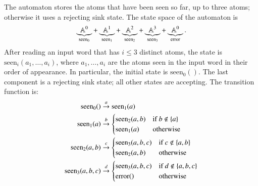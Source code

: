 {
    The automaton stores the atoms that have been seen so far, up to three atoms; otherwise it uses a rejecting sink state. The state space of the automaton is 
    \begin{align*}
    \underbrace{\mathbb A^0}_{\text{seen}_0} + \underbrace{\mathbb A^1}_{\text{seen}_1} + \underbrace{\mathbb A^2}_{\text{seen}_2} + \underbrace{\mathbb A^3}_{\text{seen}_3} + \underbrace{\mathbb A^0}_{\text{error}}.
    \end{align*}
    After reading an input word that has $i \leq 3$ distinct atoms, the state is $\text{seen}_i(a_1,\ldots,a_i)$, where $a_1,\ldots,a_i$ are the atoms seen in the input word in their order of appearance. In particular, the initial state is $\text{seen}_0()$. The last component is a rejecting sink state; all other states are accepting. The transition function is:
    \begin{align*}
    \text{seen}_0()  & \stackrel a \to \text{seen}_1(a) \\
    \text{seen}_1(a) & \stackrel b \to 
    \begin{cases}
    \text{seen}_2(a,b) & \text{if $b \not\in \{a\}$} \\
    \text{seen}_1(a) & \text{otherwise}
    \end{cases}\\
    \text{seen}_2(a,b) & \stackrel c \to
    \begin{cases}
    \text{seen}_3(a,b,c) & \text{if $c \not\in \{a,b\}$} \\
    \text{seen}_2(a,b) & \text{otherwise}
    \end{cases}\\
    \text{seen}_3(a,b,c) & \stackrel d \to 
    \begin{cases}
    \text{seen}_3(a,b,c) & \text{if $d \not\in \{a,b,c\}$} \\
    \text{error}() & \text{otherwise}
    \end{cases}
\end{align*}
}

